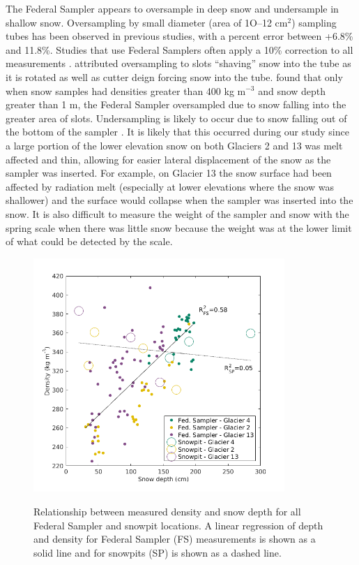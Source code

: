 \documentclass{sfuthesis}
\begin{document}
The Federal Sampler appears to oversample in deep snow and undersample in shallow snow. Oversampling by small diameter (area of 1O--12 cm$^2$) sampling tubes has been observed in previous studies, with a percent error between +6.8\% and 11.8\%\citep{Work1965, Fames1982, Conger2009}. Studies that use Federal Samplers often apply a 10\% correction to all measurements \citep[e.g.][]{Molotch2005}. \cite{Dixon2012} attributed oversampling to slots ``shaving'' snow into the tube as it is rotated as well as cutter deign forcing snow into the tube. \cite{Beaumont1963} found that only when snow samples had densities greater than 400 kg m$^{-3}$ and snow depth greater than 1 m, the Federal Sampler oversampled due to snow falling into the greater area of slots. Undersampling is likely to occur due to snow falling out of the bottom of the sampler \citep{Turcan1975}. It is likely that this occurred during our study since a large portion of the lower elevation snow on both Glaciers 2 and 13 was melt affected and thin, allowing for easier lateral displacement of the snow as the sampler was inserted. For example, on Glacier 13 the snow surface had been affected by radiation melt (especially at lower elevations where the snow was shallower) and the surface would collapse when the sampler was inserted into the snow. It is also difficult to measure the weight of the sampler and snow with the spring scale when there was little snow because the weight was at the lower limit of what could be detected by the scale. 



\begin{figure}[p]
	\centering
	\includegraphics[width =0.85\textwidth]{DepthDensity_SWEonly.png}\\
	\caption{Relationship between measured density and snow depth for all Federal Sampler and snowpit locations. A linear regression of depth and density for Federal Sampler (FS) measurements is shown as a solid line and for snowpits (SP) is shown as a dashed line.}
	\label{fig:all_depth}
\end{figure}
\end{document}
